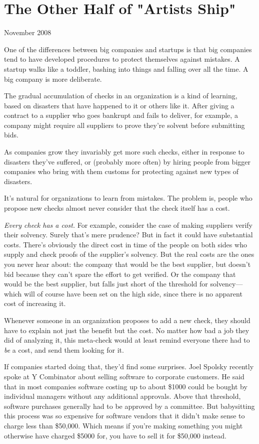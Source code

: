 \chapter{The Other Half of "Artists Ship"  }

November 2008

One of the differences between big companies and startups is that big
companies tend to have developed procedures to protect themselves
against mistakes. A startup walks like a toddler, bashing into things
and falling over all the time. A big company is more deliberate.

The gradual accumulation of checks in an organization is a kind of
learning, based on disasters that have happened to it or others like it.
After giving a contract to a supplier who goes bankrupt and fails to
deliver, for example, a company might require all suppliers to prove
they're solvent before submitting bids.

As companies grow they invariably get more such checks, either in
response to disasters they've suffered, or (probably more often) by
hiring people from bigger companies who bring with them customs for
protecting against new types of disasters.

It's natural for organizations to learn from mistakes. The problem is,
people who propose new checks almost never consider that the check
itself has a cost.

\emph{Every check has a cost.} For example, consider the case of making
suppliers verify their solvency. Surely that's mere prudence? But in
fact it could have substantial costs. There's obviously the direct cost
in time of the people on both sides who supply and check proofs of the
supplier's solvency. But the real costs are the ones you never hear
about: the company that would be the best supplier, but doesn't bid
because they can't spare the effort to get verified. Or the company that
would be the best supplier, but falls just short of the threshold for
solvency---which will of course have been set on the high side, since
there is no apparent cost of increasing it.

Whenever someone in an organization proposes to add a new check, they
should have to explain not just the benefit but the cost. No matter how
bad a job they did of analyzing it, this meta-check would at least
remind everyone there had to \emph{be} a cost, and send them looking for
it.

If companies started doing that, they'd find some surprises. Joel
Spolsky recently spoke at Y Combinator about selling software to
corporate customers. He said that in most companies software costing up
to about \$1000 could be bought by individual managers without any
additional approvals. Above that threshold, software purchases generally
had to be approved by a committee. But babysitting this process was so
expensive for software vendors that it didn't make sense to charge less
than \$50,000. Which means if you're making something you might
otherwise have charged \$5000 for, you have to sell it for \$50,000
instead.

